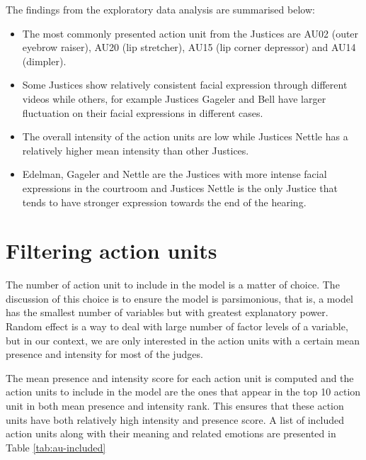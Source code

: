 \documentclass{monashthesis}
\begin{document}
The findings from the exploratory data analysis are summarised below:

\begin{itemize}
\item
  The most commonly presented action unit from the Justices are AU02 (outer eyebrow raiser), AU20 (lip stretcher), AU15 (lip corner depressor) and AU14 (dimpler).
\item
  Some Justices show relatively consistent facial expression through different videos while others, for example Justices Gageler and Bell have larger fluctuation on their facial expressions in different cases.
\item
  The overall intensity of the action units are low while Justices Nettle has a relatively higher mean intensity than other Justices.
\item
  Edelman, Gageler and Nettle are the Justices with more intense facial expressions in the courtroom and Justices Nettle is the only Justice that tends to have stronger expression towards the end of the hearing.
\end{itemize}

\let\cleardoublepage\clearpage

\hypertarget{filtering-action-units}{%
\section{Filtering action units}\label{filtering-action-units}}

The number of action unit to include in the model is a matter of choice. The discussion of this choice is to ensure the model is parsimonious, that is, a model has the smallest number of variables but with greatest explanatory power. Random effect is a way to deal with large number of factor levels of a variable, but in our context, we are only interested in the action units with a certain mean presence and intensity for most of the judges.

The mean presence and intensity score for each action unit is computed and the action units to include in the model are the ones that appear in the top 10 action unit in both mean presence and intensity rank. This ensures that these action units have both relatively high intensity and presence score. A list of included action units along with their meaning and related emotions are presented in Table \ref{tab:au-included}
\end{document}
